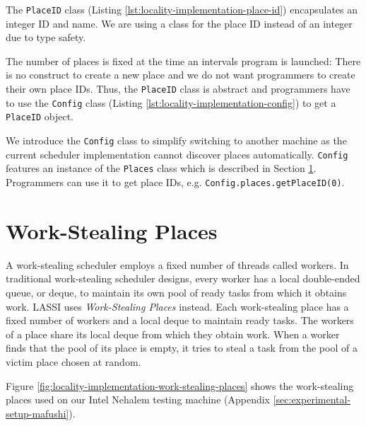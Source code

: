 The \lstinline!PlaceID! class (Listing
\ref{lst:locality-implementation-place-id}) encapsulates an integer ID
and name. We are using a class for the place ID instead of an integer
due to type safety. 

The number of places is fixed at the time an intervals program is
launched: There is no construct to create a new place and we do not
want programmers to create their own place IDs. Thus, the
\lstinline!PlaceID!  class is abstract and programmers have to use the
\lstinline!Config! class (Listing
\ref{lst:locality-implementation-config}) to get a \lstinline!PlaceID!
object.



We introduce the \lstinline!Config! class to simplify switching to
another machine as the current scheduler implementation cannot
discover places automatically. \lstinline!Config! features an instance
of the \lstinline!Places! class which is described in Section
\ref{sec:locality-implementation-work-stealing-places}. Programmers
can use it to get place IDs,
e.g. \lstinline!Config.places.getPlaceID(0)!.




\section{Work-Stealing Places}
\label{sec:locality-implementation-work-stealing-places}

A work-stealing scheduler employs a fixed number of threads called
workers. In traditional work-stealing scheduler designs, every worker
has a local double-ended queue, or deque, to maintain its own pool of
ready tasks from which it obtains work. LASSI uses \emph{Work-Stealing
  Places} instead. Each work-stealing place has a fixed number of
workers and a local deque to maintain ready tasks. The workers of a
place share its local deque from which they obtain work. When a worker
finds that the pool of its place is empty, it tries to steal a task
from the pool of a victim place chosen at random.

Figure \ref{fig:locality-implementation-work-stealing-places} shows
the work-stealing places used on our Intel Nehalem testing machine
(Appendix \ref{sec:experimental-setup-mafushi}).

